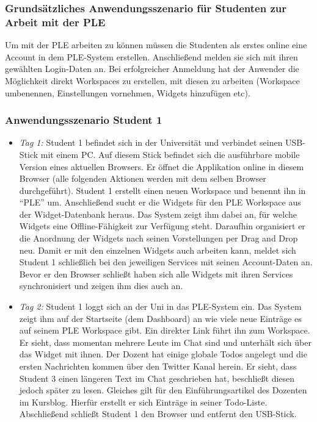 \subsubsection*{Grundsätzliches Anwendungsszenario für Studenten zur Arbeit mit der PLE}
Um mit der PLE arbeiten zu können müssen die Studenten als erstes online eine Account in dem PLE-System erstellen. Anschließend melden sie sich mit ihren gewählten Login-Daten an. Bei erfolgreicher Anmeldung hat der Anwender die Möglichkeit direkt Workspaces zu erstellen, mit diesen zu arbeiten (Workspace umbenennen, Einstellungen vornehmen, Widgets hinzufügen etc).

\subsubsection*{Anwendungsszenario Student 1}
\begin{itemize}
 \item \emph{Tag 1:} Student 1 befindet sich in der Universität und verbindet seinen USB-Stick mit einem PC. Auf diesem Stick befindet sich die ausführbare mobile Version eines aktuellen Browsers. Er öffnet die Applikation online in diesem Browser (alle folgenden Aktionen werden mit dem selben Browser durchgeführt). Student 1 erstellt einen neuen Workspace und benennt ihn in "`PLE"' um. Anschließend sucht er die Widgets für den PLE Workspace aus der Widget-Datenbank heraus. Das System zeigt ihm dabei an, für welche Widgets eine Offline-Fähigkeit zur Verfügung steht. Daraufhin organisiert er die Anordnung der Widgets nach seinen Vorstellungen per Drag and Drop neu. Damit er mit den einzelnen Widgets auch arbeiten kann, meldet sich Student 1 schließlich bei den jeweiligen Services mit seinen Account-Daten an. Bevor er den Browser schließt haben sich alle Widgets mit ihren Services synchronisiert und zeigen ihm dies auch an.
 \item \emph{Tag 2:} Student 1 loggt sich an der Uni in das PLE-System ein. Das System zeigt ihm auf der Startseite (dem Dashboard) an wie viele neue Einträge es auf seinem PLE Workspace gibt. Ein direkter Link führt ihn zum Workspace. Er sieht, dass momentan mehrere Leute im Chat sind und unterhält sich über das Widget mit ihnen. Der Dozent hat einige globale Todos angelegt und die ersten Nachrichten kommen über den Twitter Kanal herein. Er sieht, dass Student 3 einen längeren Text im Chat geschrieben hat, beschließt diesen jedoch später zu lesen. Gleiches gilt für den Einführungsartikel des Dozenten im Kursblog. Hierfür erstellt er sich Einträge in seiner Todo-Liste. Abschließend schließt Student 1 den Browser und entfernt den USB-Stick.

\end{itemize}
